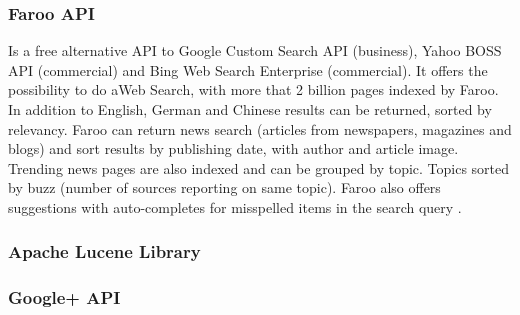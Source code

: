 \documentclass[11pt]{article}
\begin{document}
\subsubsection{Faroo API}
Is a free alternative API to Google Custom Search API (business), Yahoo BOSS API  (commercial) and Bing Web Search Enterprise (commercial). It offers the possibility to do aWeb Search, with more that 2 billion pages indexed by Faroo. In addition to English, German and Chinese results can be returned, sorted by relevancy.  Faroo can return news search (articles from newspapers, magazines and blogs) and sort results by publishing date, with author and article image. Trending news pages are also indexed and can be grouped by topic. Topics sorted by buzz (number of sources reporting on same topic). Faroo also offers suggestions with auto-completes for misspelled items in the search query \cite{faroo}.

\subsubsection{Apache Lucene Library}

\subsubsection{Google+ API}
\end{document}
